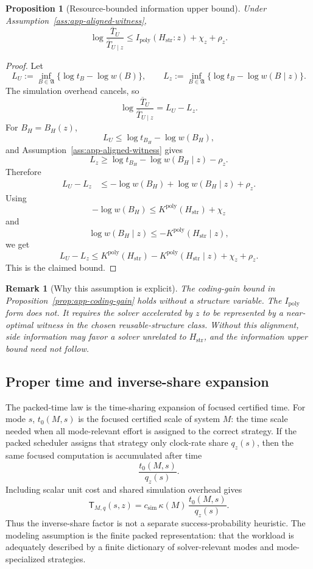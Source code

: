 \documentclass{article}
\newtheorem{proposition}{Proposition}
\newtheorem{remark}{Remark}
\begin{document}
\begin{proposition}[Resource-bounded information upper bound]
\label{prop:app-ipoly-bound}
Under Assumption~\ref{ass:app-aligned-witness},
\[
    \log\frac{\overline T_U}{\overline T_{U\mid z}}
    \le
    I_{\mathrm{poly}}(H_{\mathrm{str}}:z)+\chi_z+\rho_z.
\]
\end{proposition}

\begin{proof}
Let
\[
    L_U:=\inf_{B\in\mathfrak A}\{\log t_B-\log w(B)\},
    \qquad
    L_z:=\inf_{B\in\mathfrak A}\{\log t_B-\log w(B\mid z)\}.
\]
The simulation overhead cancels, so
\[
    \log\frac{\overline T_U}{\overline T_{U\mid z}}
    =
    L_U-L_z.
\]
For \(B_H=B_H(z)\),
\[
    L_U
    \le
    \log t_{B_H}-\log w(B_H),
\]
and Assumption~\ref{ass:app-aligned-witness} gives
\[
    L_z
    \ge
    \log t_{B_H}-\log w(B_H\mid z)-\rho_z.
\]
Therefore
\[
\begin{aligned}
    L_U-L_z
    &\le
    -\log w(B_H)+\log w(B_H\mid z)+\rho_z.
\end{aligned}
\]
Using
\[
    -\log w(B_H)
    \le
    K^{\mathrm{poly}}(H_{\mathrm{str}})+\chi_z
\]
and
\[
    \log w(B_H\mid z)
    \le
    -K^{\mathrm{poly}}(H_{\mathrm{str}}\mid z),
\]
we get
\[
    L_U-L_z
    \le
    K^{\mathrm{poly}}(H_{\mathrm{str}})
    -
    K^{\mathrm{poly}}(H_{\mathrm{str}}\mid z)
    +
    \chi_z+\rho_z.
\]
This is the claimed bound.
\end{proof}

\begin{remark}[Why this assumption is explicit]
The coding-gain bound in Proposition~\ref{prop:app-coding-gain} holds without a structure
variable.  The \(I_{\mathrm{poly}}\) form does not.  It requires the solver accelerated by
\(z\) to be represented by a near-optimal witness in the chosen reusable-structure class.
Without this alignment, side information may favor a solver unrelated to
\(H_{\mathrm{str}}\), and the information upper bound need not follow.
\end{remark}

\subsection{Proper time and inverse-share expansion}
\label{app:proper-time-inverse-share}

The packed-time law is the time-sharing expansion of focused certified time.
For mode \(s\), \(t_0(M,s)\) is the focused certified scale of system \(M\): the time
scale needed when all mode-relevant effort is assigned to the correct strategy.
If the packed scheduler assigns that strategy only clock-rate share \(q_z(s)\), then the
same focused computation is accumulated after time
\[
    \frac{t_0(M,s)}{q_z(s)}.
\]
Including scalar unit cost and shared simulation overhead gives
\[
    \mathsf T_{M,q}(s,z)
    =
    c_{\mathrm{sim}}\,
    \kappa(M)\,
    \frac{t_0(M,s)}{q_z(s)}.
\]
Thus the inverse-share factor is not a separate success-probability heuristic.
The modeling assumption is the finite packed representation: that the workload is
adequately described by a finite dictionary of solver-relevant modes and mode-specialized
strategies.
\end{document}
